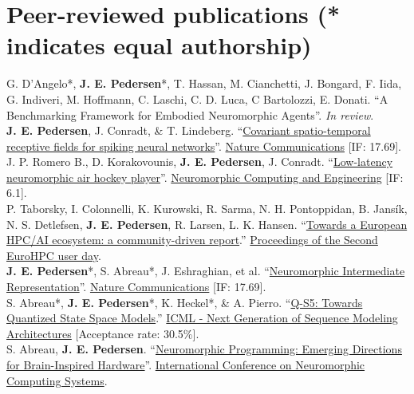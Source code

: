 \documentclass[11pt, a4paper]{article}
\newcommand{\years}[1]{\marginnote{\scriptsize #1}}
\begin{document}
\section*{Peer-reviewed publications {\small (* indicates equal authorship)}}
\years{2025}G. D'Angelo*, \textbf{J. E. Pedersen}*, T. Hassan, M. Cianchetti, J. Bongard, F. Iida, G. Indiveri, M. Hoffmann, C. Laschi, C. D. Luca, C Bartolozzi, E. Donati. ``A Benchmarking Framework for Embodied Neuromorphic Agents''. \textit{In review}. \\
\years{2025}\textbf{J. E. Pedersen}, J. Conradt, \& T. Lindeberg. ``\href{https://arxiv.org/abs/2405.00318}{Covariant spatio-temporal receptive fields for spiking neural networks}''. \href{https://www.nature.com/ncomms/}{Nature Communications} [IF: 17.69]. \\
\years{2025}J. P. Romero B., D. Korakovounis, \textbf{J. E. Pedersen}, J. Conradt. ``\href{https://doi.org/10.1088/2634-4386/addc15}{Low-latency neuromorphic air hockey player}''. \href{https://iopscience.iop.org/journal/2634-4386}{Neuromorphic Computing and Engineering} [IF: 6.1]. \\
\years{2025} P. Taborsky, I. Colonnelli, K. Kurowski, R. Sarma, N. H. Pontoppidan, B. Jansík, N. S. Detlefsen, \textbf{J. E. Pedersen}, R. Larsen, L. K. Hansen. ``\href{https://www.sciencedirect.com/science/article/pii/S1877050925006301}{Towards a European HPC/AI ecosystem: a community-driven report}.'' \href{https://www.sciencedirect.com/journal/procedia-computer-science/vol/255/suppl/C}{Proceedings of the Second EuroHPC user day}. \\
\years{2024}\textbf{J. E. Pedersen}*, S. Abreau*, J. Eshraghian, et al. ``\href{https://doi.org/10.1038/s41467-024-52259-9}{Neuromorphic Intermediate Representation}''. \href{https://www.nature.com/ncomms/}{Nature Communications} [IF: 17.69]. \\
\years{2024} S. Abreau*, \textbf{J. E. Pedersen}*, K. Heckel*, \& A. Pierro. ``\href{https://openreview.net/forum?id=30Rq6yXr8I}{Q-S5: Towards Quantized State Space Models}.'' \href{https://icml.cc/virtual/2024/workshop/29962}{ICML - Next Generation of Sequence Modeling Architectures} [Acceptance rate: 30.5\%]. \\
\years{2024} S. Abreau, \textbf{J. E. Pedersen}.
``\href{https://ieeexplore.ieee.org/document/10766507}{Neuromorphic Programming: Emerging Directions for Brain-Inspired Hardware}''.
\href{https://iconsneuromorphic.cc/}{International Conference on Neuromorphic Computing Systems}. \\
\end{document}
